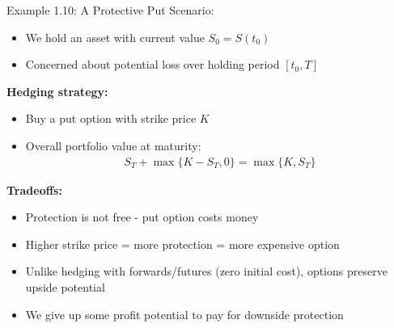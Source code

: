 \documentclass[10pt,handout]{beamer}
\begin{document}
\begin{frame}{Example 1.10: A Protective Put}
  Scenario:
  \begin{itemize}
    \item We hold an asset with current value $S_0 = S(t_0)$
    \item Concerned about potential loss over holding period $[t_0, T]$
  \end{itemize}
  
  \pause
  \textbf{Hedging strategy:}
  \begin{itemize}
    \item Buy a put option with strike price $K$
    \item Overall portfolio value at maturity:
    \begin{align*}
      S_T + \max\{K - S_T, 0\} = \max\{K, S_T\}
    \end{align*}
  \end{itemize}
  
  \pause
  \textbf{Tradeoffs:}
  \begin{itemize}
    \item Protection is not free - put option costs money
    \item Higher strike price = more protection = more expensive option
    \item Unlike hedging with forwards/futures (zero initial cost), options preserve upside potential
    \item We give up some profit potential to pay for downside protection
  \end{itemize}
\end{frame}
\end{document}
